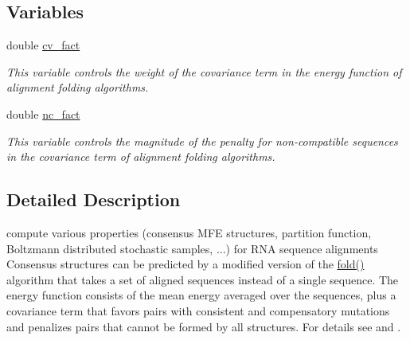 \subsection*{Variables}
\begin{DoxyCompactItemize}
\item 
double \hyperlink{group__consensus__fold_gaf3cbac6ff5d706d6e414677841ddf94c}{cv\-\_\-fact}
\begin{DoxyCompactList}\small\item\em This variable controls the weight of the covariance term in the energy function of alignment folding algorithms. \end{DoxyCompactList}\item 
double \hyperlink{group__consensus__fold_ga502948a122a2af5b914355b1f3ea2f61}{nc\-\_\-fact}
\begin{DoxyCompactList}\small\item\em This variable controls the magnitude of the penalty for non-\/compatible sequences in the covariance term of alignment folding algorithms. \end{DoxyCompactList}\end{DoxyCompactItemize}


\subsection{Detailed Description}
compute various properties (consensus M\-F\-E structures, partition function, Boltzmann distributed stochastic samples, ...) for R\-N\-A sequence alignments Consensus structures can be predicted by a modified version of the \hyperlink{group__mfe__fold__single_gaadafcb0f140795ae62e5ca027e335a9b}{fold()} algorithm that takes a set of aligned sequences instead of a single sequence. The energy function consists of the mean energy averaged over the sequences, plus a covariance term that favors pairs with consistent and compensatory mutations and penalizes pairs that cannot be formed by all structures. For details see \cite{hofacker:2002} and \cite{bernhart:2008}. 

